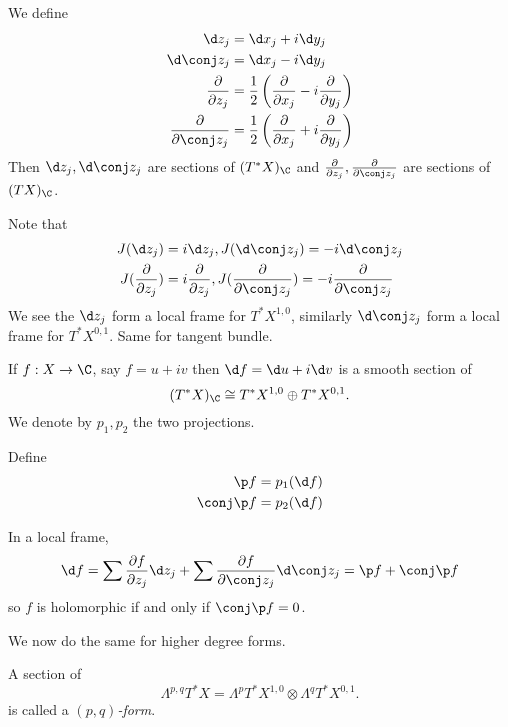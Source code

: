 \documentclass[a4paper]{article}
\begin{document}
\begin{definition}
  We define
  \begin{align*}
    \d z_j &= \d x_j + i\d y_j \\
    \d\conj z_j &= \d x_j - i\d y_j \\
    \frac{\partial  }{\partial z_j} &= \frac{1}{2} \left( \frac{\partial  }{\partial x_j} - i \frac{\partial  }{\partial y_j} \right) \\
    \frac{\partial  }{\partial \conj z_j} &= \frac{1}{2} \left( \frac{\partial  }{\partial x_j} + i \frac{\partial  }{\partial y_j} \right)
  \end{align*}
  Then \(\d z_j, \d\conj z_j\) are sections of \((T^*X)_\C\) and \(\frac{\partial  }{\partial z_j}, \frac{\partial  }{\partial \conj z_j}\) are sections of \((TX)_\C\).
\end{definition}

Note that
\begin{align*}
  J(\d z_j) &= i \d z_j, J(\d\conj z_j) = -i \d\conj z_j \\
  J(\frac{\partial  }{\partial z_j}) &= i \frac{\partial  }{\partial z_j}, J(\frac{\partial  }{\partial \conj z_j}) = -i \frac{\partial  }{\partial \conj z_j}
\end{align*}
We see the \(\d z_j\) form a local frame for \(T^*X^{1, 0}\), similarly \(\d\conj z_j\) form a local frame for \(T^*X^{0, 1}\). Same for tangent bundle.

If \(f: X \to \C\), say \(f = u + iv\) then \(\d f = \d u + i\d v\) is a smooth section of
\[
  (T^*X)_\C \cong T^*X^{1, 0} \oplus T^*X^{0, 1}.
\]
We denote by \(p_1, p_2\) the two projections.

\begin{definition}
  Define
  \begin{align*}
    \p f &= p_1 (\d f) \\
    \conj \p f&= p_2 (\d f)
  \end{align*}
\end{definition}

In a local frame,
\[
  \d f
  = \sum \frac{\partial f}{\partial z_j} \d z_j + \sum \frac{\partial f}{\partial \conj z_j} \d\conj z_j
  = \p f + \conj \p f
\]
so \(f\) is holomorphic if and only if \(\conj \p f = 0\).

We now do the same for higher degree forms.

\begin{definition}[form]
  A section of
  \[
    \Lambda^{p, q}T^*X = \Lambda^pT^*X^{1, 0} \otimes \Lambda^qT^*X^{0, 1}.
  \]
  is called a \emph{\((p, q)\)-form}.
\end{definition}
\end{document}
